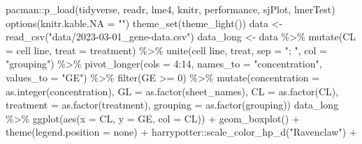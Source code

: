 \documentclass[
  letterpaper,
  DIV=11,
  numbers=noendperiod]{scrartcl}
\newenvironment{Shaded}{\begin{snugshade}}{\end{snugshade}}
\newcommand{\AttributeTok}[1]{\textcolor[rgb]{0.40,0.45,0.13}{#1}}
\newcommand{\DecValTok}[1]{\textcolor[rgb]{0.68,0.00,0.00}{#1}}
\newcommand{\FunctionTok}[1]{\textcolor[rgb]{0.28,0.35,0.67}{#1}}
\newcommand{\NormalTok}[1]{\textcolor[rgb]{0.00,0.23,0.31}{#1}}
\newcommand{\OtherTok}[1]{\textcolor[rgb]{0.00,0.23,0.31}{#1}}
\newcommand{\SpecialCharTok}[1]{\textcolor[rgb]{0.37,0.37,0.37}{#1}}
\newcommand{\StringTok}[1]{\textcolor[rgb]{0.13,0.47,0.30}{#1}}
\begin{document}
\begin{Shaded}
\begin{Highlighting}[]
\NormalTok{pacman}\SpecialCharTok{::}\FunctionTok{p\_load}\NormalTok{(tidyverse, readr, lme4, knitr, performance, sjPlot, lmerTest)}
\FunctionTok{options}\NormalTok{(}\AttributeTok{knitr.kable.NA =} \StringTok{""}\NormalTok{)}
\FunctionTok{theme\_set}\NormalTok{(}\FunctionTok{theme\_light}\NormalTok{())}
\NormalTok{data }\OtherTok{\textless{}{-}} \FunctionTok{read\_csv}\NormalTok{(}\StringTok{"data/2023{-}03{-}01\_gene{-}data.csv"}\NormalTok{)}
\NormalTok{data\_long }\OtherTok{\textless{}{-}}\NormalTok{ data }\SpecialCharTok{\%\textgreater{}\%}
  \FunctionTok{mutate}\NormalTok{(}\AttributeTok{CL =} \StringTok{\textasciigrave{}}\AttributeTok{cell line}\StringTok{\textasciigrave{}}\NormalTok{,}
         \AttributeTok{treat =}\NormalTok{ treatment) }\SpecialCharTok{\%\textgreater{}\%}
  \FunctionTok{unite}\NormalTok{(}\StringTok{\textasciigrave{}}\AttributeTok{cell line}\StringTok{\textasciigrave{}}\NormalTok{, }\StringTok{\textasciigrave{}}\AttributeTok{treat}\StringTok{\textasciigrave{}}\NormalTok{, }\AttributeTok{sep =} \StringTok{"; "}\NormalTok{, }\AttributeTok{col =} \StringTok{"grouping"}\NormalTok{) }\SpecialCharTok{\%\textgreater{}\%}
  \FunctionTok{pivot\_longer}\NormalTok{(}\AttributeTok{cols =} \DecValTok{4}\SpecialCharTok{:}\DecValTok{14}\NormalTok{, }\AttributeTok{names\_to =} \StringTok{"concentration"}\NormalTok{, }\AttributeTok{values\_to =} \StringTok{"GE"}\NormalTok{) }\SpecialCharTok{\%\textgreater{}\%}
  \FunctionTok{filter}\NormalTok{(GE }\SpecialCharTok{\textgreater{}=} \DecValTok{0}\NormalTok{) }\SpecialCharTok{\%\textgreater{}\%}
  \FunctionTok{mutate}\NormalTok{(}\AttributeTok{concentration =} \FunctionTok{as.integer}\NormalTok{(concentration),}
         \AttributeTok{GL =} \FunctionTok{as.factor}\NormalTok{(sheet\_names),}
         \AttributeTok{CL =} \FunctionTok{as.factor}\NormalTok{(CL),}
         \AttributeTok{treatment =} \FunctionTok{as.factor}\NormalTok{(treatment),}
         \AttributeTok{grouping =} \FunctionTok{as.factor}\NormalTok{(grouping))}
\NormalTok{data\_long }\SpecialCharTok{\%\textgreater{}\%}
  \FunctionTok{ggplot}\NormalTok{(}\FunctionTok{aes}\NormalTok{(}\AttributeTok{x =}\NormalTok{ CL, }\AttributeTok{y =}\NormalTok{ GE, }\AttributeTok{col =}\NormalTok{ CL)) }\SpecialCharTok{+}
  \FunctionTok{geom\_boxplot}\NormalTok{() }\SpecialCharTok{+}
  \FunctionTok{theme}\NormalTok{(}\AttributeTok{legend.position =} \StringTok{\textquotesingle{}none\textquotesingle{}}\NormalTok{) }\SpecialCharTok{+}
\NormalTok{  harrypotter}\SpecialCharTok{::}\FunctionTok{scale\_color\_hp\_d}\NormalTok{(}\StringTok{"Ravenclaw"}\NormalTok{) }\SpecialCharTok{+}

\end{Highlighting}
\end{Shaded}
\end{document}
